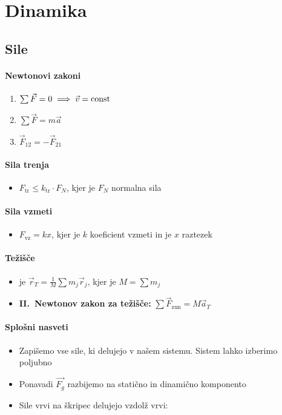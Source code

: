 \section{Dinamika}
\subsection{Sile}
\paragraph{Newtonovi zakoni}
\begin{enumerate}
    \item \(\sum \vec{F} = 0 \implies \vec{v} = \text{const}\)
    \item \(\sum \vec{F} = m \vec{a}\) 
    \item \(\vec{F}_{12} = -\vec{F}_{21}\) 
\end{enumerate}

\paragraph{Sila trenja}
\begin{itemize}
    \item \(F_\text{tr} \leq k_\text{tr} \cdot F_N\), kjer je \(F_N\) normalna sila
\end{itemize}

\paragraph{Sila vzmeti}
\begin{itemize}
    \item \(F_\text{vz} = kx\), kjer je \(k\) koeficient vzmeti in je \(x\) raztezek
\end{itemize}

\paragraph{Težišče}
\begin{itemize}
    \item {} je \(\vec{r}_T = \frac{1}{M} \sum m_j \vec{r}_j\), kjer je \(M = \sum m_j\) 
    \item \textbf{II.\ Newtonov zakon za težišče:} \(\sum \vec{F}_\text{zun} = M \vec{a}_T\)
\end{itemize}

\paragraph{Splošni nasveti}
\begin{itemize}
    \item Zapišemo vse sile, ki delujejo v našem sistemu. Sistem lahko izberimo poljubno
    \item Ponavadi \(\vec{F_g}\) razbijemo na statično in dinamično komponento
    \item Sile vrvi na škripec delujejo vzdolž vrvi:
\end{itemize}

